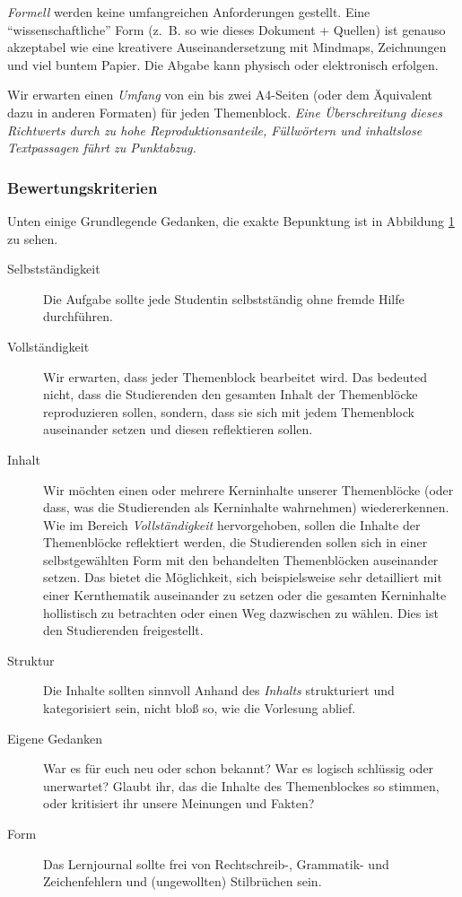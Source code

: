 \documentclass[DIV=15,headinclude=true]{scrartcl}
\begin{document}
\emph{Formell} werden keine umfangreichen Anforderungen gestellt. Eine
\enquote{wissenschaftliche} Form (z.~B. so wie dieses Dokument +
Quellen) ist genauso akzeptabel wie eine kreativere Auseinandersetzung
mit Mindmaps, Zeichnungen und viel buntem Papier. Die Abgabe kann
physisch oder elektronisch erfolgen.

Wir erwarten einen \emph{Umfang} von ein bis zwei A4-Seiten (oder dem
Äquivalent dazu in anderen Formaten) für jeden Themenblock. \emph{Eine Überschreitung dieses Richtwerts durch zu hohe Reproduktionsanteile, Füllwörtern und inhaltslose Textpassagen führt zu Punktabzug.}

\subsubsection{Bewertungskriterien}

Unten einige Grundlegende Gedanken, die exakte Bepunktung ist in
Abbildung \protect\hyperlink{abb:lernjournal}{1} zu sehen.

\begin{description}
	\item[Selbstständigkeit]
	      Die Aufgabe sollte jede Studentin selbstständig ohne fremde Hilfe
	      durchführen.
	\item[Vollständigkeit]
	      Wir erwarten, dass jeder Themenblock bearbeitet wird. Das bedeuted
	      nicht, dass die Studierenden den gesamten Inhalt der Themenblöcke
	      reproduzieren sollen, sondern, dass sie sich mit jedem Themenblock
	      auseinander setzen und diesen reflektieren sollen.
	\item[Inhalt]
	      Wir möchten einen oder mehrere Kerninhalte unserer Themenblöcke (oder
	      dass, was die Studierenden als Kerninhalte wahrnehmen) wiedererkennen.
	      Wie im Bereich \emph{Vollständigkeit} hervorgehoben, sollen die Inhalte
	      der Themenblöcke reflektiert werden, die Studierenden sollen sich in
	      einer selbstgewählten Form mit den behandelten Themenblöcken auseinander
	      setzen. Das bietet die Möglichkeit, sich beispielsweise sehr detailliert
	      mit einer Kernthematik auseinander zu setzen oder die gesamten
	      Kerninhalte hollistisch zu betrachten oder einen Weg dazwischen zu
	      wählen. Dies ist den Studierenden freigestellt.
	\item[Struktur]
	      Die Inhalte sollten sinnvoll Anhand des \emph{Inhalts} strukturiert und
	      kategorisiert sein, nicht bloß so, wie die Vorlesung ablief.
	\item[Eigene Gedanken]
	      War es für euch neu oder schon bekannt? War es logisch schlüssig oder
	      unerwartet? Glaubt ihr, das die Inhalte des Themenblockes so stimmen,
	      oder kritisiert ihr unsere Meinungen und Fakten?
	\item[Form]
	      Das Lernjournal sollte frei von Rechtschreib-, Grammatik- und
	      Zeichenfehlern und (ungewollten) Stilbrüchen sein.
\end{description}
\end{document}
